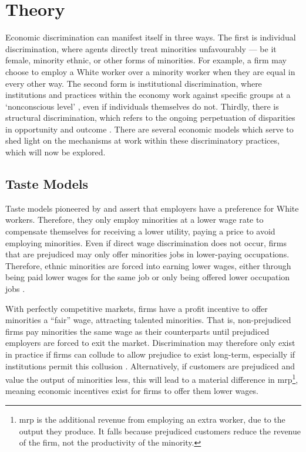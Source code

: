 \documentclass[class=article, crop=false]{standalone}
\begin{document}
\section{Theory}
\label{sec:Theory}
Economic discrimination can manifest itself in three ways. The first is individual discrimination, where agents directly treat minorities unfavourably --- be it female, minority ethnic, or other forms of minorities. For example, a firm may choose to employ a White worker over a minority worker when they are equal in every other way. The second form is institutional discrimination, where institutions and practices within the economy work against specific groups at a \enquote*{nonconscious level} \cite[p.~1814]{Ian}, even if individuals themselves do not. Thirdly, there is structural discrimination, which refers to the ongoing perpetuation of disparities in opportunity and outcome \citep{Lawrence}. There are several economic models which serve to shed light on the mechanisms at work within these discriminatory practices, which will now be explored.

\subsection{Taste Models}
\label{sec:Human Capital Models}
Taste models pioneered by \citet{Becker} and \citet{Arrow} assert that employers have a preference for White workers. Therefore, they only employ minorities at a lower wage rate to compensate themselves for receiving a lower utility, paying a price to avoid employing minorities. Even if direct wage discrimination does not occur, firms that are prejudiced may only offer minorities jobs in lower-paying occupations. Therefore, ethnic minorities are forced into earning lower wages, either through being paid lower wages for the same job or only being offered lower occupation jobs \citep{Coate}.

With perfectly competitive markets, firms have a profit incentive to offer minorities a \enquote{fair} wage, attracting talented minorities. That is, non-prejudiced firms pay minorities the same wage as their counterparts until prejudiced employers are forced to exit the market. Discrimination may therefore only exist in practice if firms can collude to allow prejudice to exist long-term, especially if institutions permit this collusion \citep{LundbergB}. Alternatively, if customers are prejudiced and value the output of minorities less, this will lead to a material difference in \acrfull{mrp}\footnote{\acrshort{mrp} is the additional revenue from employing an extra worker, due to the output they produce. It falls because prejudiced customers reduce the revenue of the firm, not the productivity of the minority.}, meaning economic incentives exist for firms to offer them lower wages.
\end{document}
